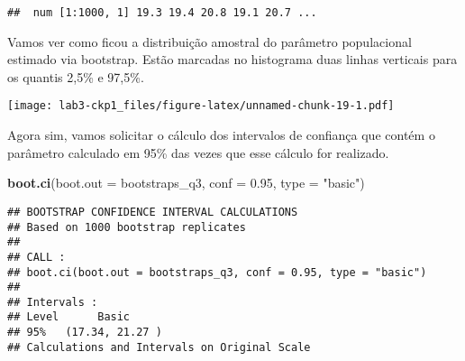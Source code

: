 \documentclass[]{article}
\newenvironment{Shaded}{\begin{snugshade}}{\end{snugshade}}
\newcommand{\KeywordTok}[1]{\textcolor[rgb]{0.13,0.29,0.53}{\textbf{#1}}}
\newcommand{\DataTypeTok}[1]{\textcolor[rgb]{0.13,0.29,0.53}{#1}}
\newcommand{\DecValTok}[1]{\textcolor[rgb]{0.00,0.00,0.81}{#1}}
\newcommand{\FloatTok}[1]{\textcolor[rgb]{0.00,0.00,0.81}{#1}}
\newcommand{\StringTok}[1]{\textcolor[rgb]{0.31,0.60,0.02}{#1}}
\newcommand{\OperatorTok}[1]{\textcolor[rgb]{0.81,0.36,0.00}{\textbf{#1}}}
\newcommand{\NormalTok}[1]{#1}
\begin{document}
\begin{verbatim}
##  num [1:1000, 1] 19.3 19.4 20.8 19.1 20.7 ...
\end{verbatim}

Vamos ver como ficou a distribuição amostral do parâmetro populacional
estimado via bootstrap. Estão marcadas no histograma duas linhas
verticais para os quantis 2,5\% e 97,5\%.

\begin{Shaded}
\end{Shaded}

\texttt{[image: lab3-ckp1\_files/figure-latex/unnamed-chunk-19-1.pdf]}

Agora sim, vamos solicitar o cálculo dos intervalos de confiança que
contém o parâmetro calculado em 95\% das vezes que esse cálculo for
realizado.

\begin{Shaded}
\begin{Highlighting}[]
\KeywordTok{boot.ci}\NormalTok{(}\DataTypeTok{boot.out =}\NormalTok{ bootstraps_q3, }\DataTypeTok{conf =} \FloatTok{0.95}\NormalTok{, }\DataTypeTok{type =} \StringTok{"basic"}\NormalTok{)}
\end{Highlighting}
\end{Shaded}

\begin{verbatim}
## BOOTSTRAP CONFIDENCE INTERVAL CALCULATIONS
## Based on 1000 bootstrap replicates
## 
## CALL : 
## boot.ci(boot.out = bootstraps_q3, conf = 0.95, type = "basic")
## 
## Intervals : 
## Level      Basic         
## 95%   (17.34, 21.27 )  
## Calculations and Intervals on Original Scale
\end{verbatim}
\end{document}
